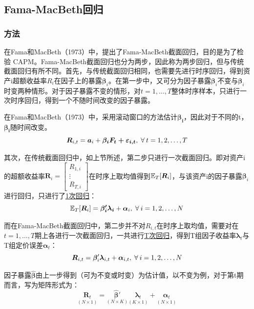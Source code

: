 \documentclass[11pt]{article}
\begin{document}
\subsection{Fama-MacBeth回归}

\subsubsection{方法}

在Fama和MacBeth（1973）中，提出了Fama-MacBeth截面回归，目的是为了检验 CAPM。Fama-MacBeth截面回归也分为两步，因此称为两步回归，但与传统截面回归有所不同。首先，与传统截面回归相同，也需要先进行时序回归，得到资产i超额收益率$R_i$在因子上的暴露$\bm{\beta}_i$。在第一步中，又可分为因子暴露$\bm{\beta}_i$不变与$\bm{\beta}_i$时变两种情形。对于因子暴露不变的情形，对$t=1,\dots,T$整体时序样本，只进行一次时序回归，得到一个不随时间改变的因子暴露。

在Fama和MacBeth（1973）中，采用滚动窗口的方法估计$\bm{\beta_i}$，因此对于不同的t，$\bm{\beta_i}$随时间改变。
\begin{equation*}
    \bm{R}_{i,t} = \bm{a}_i + \bm{\beta_{i} \bm{F}_t + \bm{\varepsilon}_{i,t}} \ilsep \forall t=1,2,\dots,T
\end{equation*}

其次，在传统截面回归中，如上节所述，第二步只进行一次截面回归。即对资产i的超额收益率$\bm{R}_i = \begin{bmatrix} R_{1,i} \\ \vdots \\ R_{T,i} \end{bmatrix}$在时序上取均值得到$\mathbb{E}_T[\bm{R}_i]$，与该资产i的因子暴露$\bm{\beta}_i$进行回归，只进行了\uline{1次回归}：
\begin{equation*}
    \E_T[\bm{R}_i] = \bm{\beta_{i}' \lambda_i} + \bm{\alpha}_i \ilsep \forall i=1,2,\dots,N
\end{equation*}

而在Fama-MacBeth截面回归中，第二步并不对$R_{i,t}$在时序上取均值，需要对在$t=1,\dots,T$期上各进行一次截面回归，一共进行\uline{T次回归}，得到T组因子收益率$\bm{\lambda}_t$与T组定价误差$\bm{\alpha}_t$：
\begin{equation*}
    \bm{R}_{i,t} = \bm{\beta}_{i}' \bm{\lambda}_{i,t} + \bm{\alpha}_{i,t} \ilsep \forall i=1,2,\dots,N
\end{equation*}

因子暴露$\hat{\bm{\beta}}$由上一步得到（可为不变或时变）为估计值，以不变为例，对于第t期而言，写为矩阵形式为：
\begin{equation*}
    \underset{\scriptscriptstyle{(N \times 1)}}{\bm{R}_t} = \underset{\scriptscriptstyle{(N \times K)}}{\hat{\bm{\beta}}'} \underset{\scriptscriptstyle{(K \times 1)}}{\bm{\lambda}_t} + \underset{\scriptscriptstyle{(N \times 1)}}{\bm{\alpha}_t}
\end{equation*}
\end{document}
